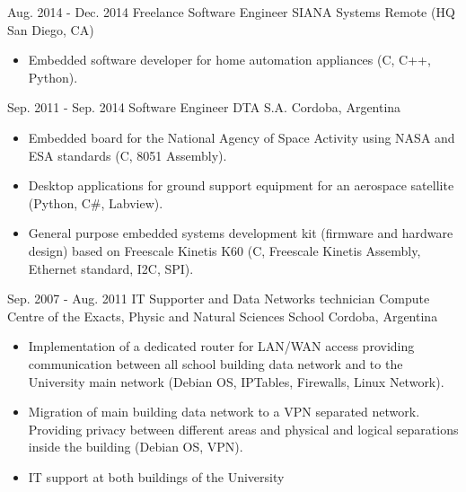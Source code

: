   \cventry
    {Aug. 2014 - Dec. 2014} %
    {Freelance Software Engineer} %
    {SIANA Systems} %
    {Remote (HQ San Diego, CA)} %
    {}
    {
      \begin{itemize} %
        \item {Embedded software developer for home automation appliances (C, C++, Python).}
      \end{itemize}
    }

  \cventry
    {Sep. 2011 - Sep. 2014} %
    {Software Engineer} %
    {DTA S.A.} %
    {Cordoba, Argentina} %
    {}
    {
      \begin{itemize} %
        \item {Embedded board for the National Agency of Space Activity using NASA and ESA standards (C, 8051 Assembly).}
        \item {Desktop applications for ground support equipment for an aerospace satellite (Python, C\#, Labview).}
        \item {General purpose embedded systems development kit (firmware and hardware design) based on Freescale Kinetis K60 (C, Freescale Kinetis Assembly, Ethernet standard, I2C, SPI).}
      \end{itemize}
    }

  \cventry
    {Sep. 2007 - Aug. 2011} %
    {IT Supporter and Data Networks technician} %
    {Compute Centre of the Exacts, Physic and Natural Sciences School} %
    {Cordoba, Argentina} %
    {}
    {
      \begin{itemize} %
        \item {Implementation of a dedicated router for LAN/WAN access providing communication between all school building data network and to the University main network (Debian OS, IPTables, Firewalls, Linux Network).}
        \item {Migration of main building data network to a VPN separated network. Providing privacy between different areas and physical and logical separations inside the building (Debian OS, VPN).}
        \item {IT support at both buildings of the University}
      \end{itemize}
    }

